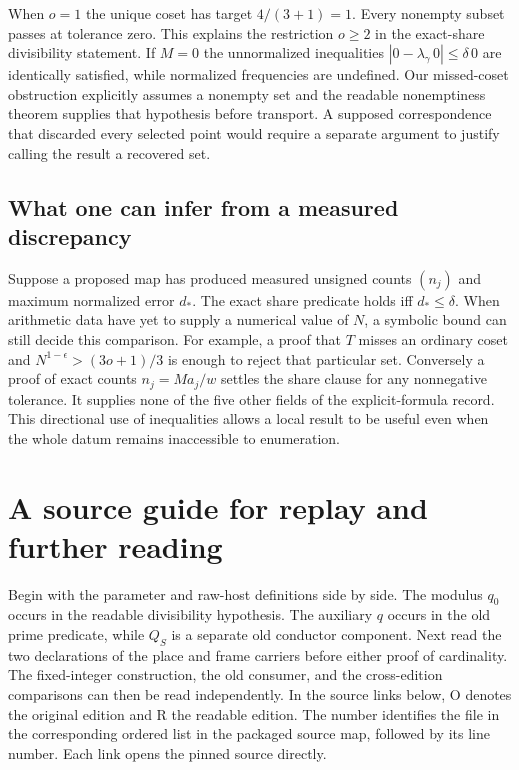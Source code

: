 \documentclass[12pt,letterpaper]{article}
\begin{document}
When $o=1$ the unique coset has target $4/(3+1)=1$. Every nonempty subset passes at tolerance zero. This explains the restriction $o\ge2$ in the exact-share divisibility statement. If $M=0$ the unnormalized inequalities $|0-\lambda_\gamma\,0|\le\delta\,0$ are identically satisfied, while normalized frequencies are undefined. Our missed-coset obstruction explicitly assumes a nonempty set and the readable nonemptiness theorem supplies that hypothesis before transport. A supposed correspondence that discarded every selected point would require a separate argument to justify calling the result a recovered set.

\subsection{What one can infer from a measured discrepancy}
Suppose a proposed map has produced measured unsigned counts $(n_j)$ and maximum normalized error $d_*$. The exact share predicate holds iff $d_*\le\delta$. When arithmetic data have yet to supply a numerical value of $N$, a symbolic bound can still decide this comparison. For example, a proof that $T$ misses an ordinary coset and $N^{1-\epsilon}>(3o+1)/3$ is enough to reject that particular set. Conversely a proof of exact counts $n_j=M a_j/w$ settles the share clause for any nonnegative tolerance. It supplies none of the five other fields of the explicit-formula record. This directional use of inequalities allows a local result to be useful even when the whole datum remains inaccessible to enumeration.

\section{A source guide for replay and further reading}
Begin with the parameter and raw-host definitions side by side. The modulus $q_0$ occurs in the readable divisibility hypothesis. The auxiliary $q$ occurs in the old prime predicate, while $Q_S$ is a separate old conductor component. Next read the two declarations of the place and frame carriers before either proof of cardinality. The fixed-integer construction, the old consumer, and the cross-edition comparisons can then be read independently. In the source links below, O denotes the original edition and R the readable edition. The number identifies the file in the corresponding ordered list in the packaged source map, followed by its line number. Each link opens the pinned source directly.
\end{document}
